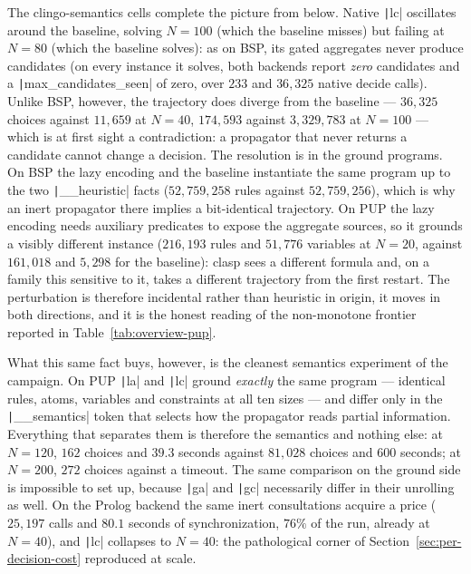 The clingo-semantics cells complete the picture from below. Native \texttt|lc| oscillates around the baseline, solving $N=100$ (which the baseline misses) but failing at $N=80$ (which the baseline solves): as on BSP, its gated aggregates never produce candidates (on every instance it solves, both backends report \emph{zero} candidates and a \texttt|max_candidates_seen| of zero, over $233$ and $36{,}325$ native decide calls). Unlike BSP, however, the trajectory does diverge from the baseline --- $36{,}325$ choices against $11{,}659$ at $N=40$, $174{,}593$ against $3{,}329{,}783$ at $N=100$ --- which is at first sight a contradiction: a propagator that never returns a candidate cannot change a decision. The resolution is in the ground programs. On BSP the lazy encoding and the baseline instantiate the same program up to the two \texttt|__heuristic| facts ($52{,}759{,}258$ rules against $52{,}759{,}256$), which is why an inert propagator there implies a bit-identical trajectory. On PUP the lazy encoding needs auxiliary predicates to expose the aggregate sources, so it grounds a visibly different instance ($216{,}193$ rules and $51{,}776$ variables at $N=20$, against $161{,}018$ and $5{,}298$ for the baseline): clasp sees a different formula and, on a family this sensitive to it, takes a different trajectory from the first restart. The perturbation is therefore incidental rather than heuristic in origin, it moves in both directions, and it is the honest reading of the non-monotone frontier reported in Table~\ref{tab:overview-pup}.

What this same fact buys, however, is the cleanest semantics experiment of the campaign. On PUP \texttt|la| and \texttt|lc| ground \emph{exactly} the same program --- identical rules, atoms, variables and constraints at all ten sizes --- and differ only in the \texttt|__semantics| token that selects how the propagator reads partial information. Everything that separates them is therefore the semantics and nothing else: at $N=120$, $162$ choices and $39.3$ seconds against $81{,}028$ choices and $600$ seconds; at $N=200$, $272$ choices against a timeout. The same comparison on the ground side is impossible to set up, because \texttt|ga| and \texttt|gc| necessarily differ in their unrolling as well. On the Prolog backend the same inert consultations acquire a price ($25{,}197$ calls and $80.1$ seconds of synchronization, $76\%$ of the run, already at $N=40$), and \texttt|lc| collapses to $N=40$: the pathological corner of Section~\ref{sec:per-decision-cost} reproduced at scale.

